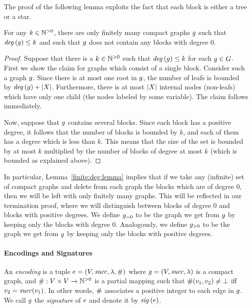 %
The proof of the following 
lemma exploits the fact that each block is either a tree or a star.
%
\begin{lemma}
\label{finite:deg:lemma}
For any $k\in{\mathbb N}^{>0}$, there are only finitely many compact graphs $g$ 
such that ${\it deg}\left(g\right)\leq k$ and such that $g$ does not contain
any blocks with degree $0$.
\end{lemma}
%
\begin{proof}
Suppose that there is a $k\in{\mathbb N}^{>0}$ such that ${\it deg}\left(g\right)\leq k$ for 
each $g\in G$.
%
First we show the claim for graphs which consist of a single block.
%
Consider such a graph $g$.
%
Since there is at most one root in $g$,
the number of leafs is bounded by ${\it deg}\left(g\right)+|X|$.
%
Furthermore, there is at most $|X|$ internal nodes (non-leafs) which have only 
one child (the nodes labeled by some variable).
%
The claim follows immediately.

Now, suppose that $g$ contains several blocks.
%
Since each block has a positive degree, it follows that the number of blocks 
is bounded by $k$, and
each of them has a degree which is less than $k$.
%
This means that the size of the set is bounded by at most $k$ multiplied by the number
of blocks of degree at most $k$ (which is bounded as explained above).
\end{proof}

In particular, Lemma~\ref{finite:deg:lemma} implies that if we take any 
(infinite) set of compact graphs
and delete from each graph the blocks which are of degree $0$, then we will be left
with only finitely many graphs.
%
This will be reflected in our termination proof, where we will distinguish
between blocks of degree $0$ and blocks with positive degrees.
%
We define ${g}_{=0}$ to be the graph
we get from $g$ by keeping only the blocks
with degree $0$.
%
Analogously, we define ${g}_{>0}$ to be the graph
we get from $g$ by keeping only the blocks
with positive degrees.


\paragraph{\bf Encodings and Signatures}
%

%
An {\it encoding} is a tuple $e=\left(V,{\it succ},\lambda,\#\right)$ where
$g=\left(V,{\it succ},\lambda\right)$ is a compact graph, and
$\#:V\times V\rightarrow{\mathbb N}^{>0}$ is a partial mapping such that
$\#(v_1,v_2)\neq\bot$ iff $v_2={\it succ}(v_1)$.
%
In other words, $\#$ associates a positive integer to each edge in $g$.
%
We call $g$ the {\it signature} of $e$ and denote it by ${\it sig}\left(e\right)$.

